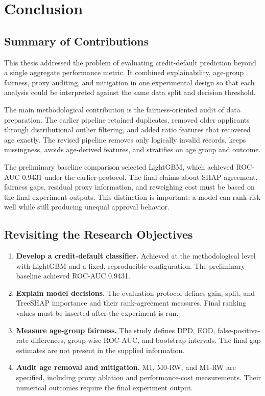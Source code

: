 \chapter{Conclusion}
\label{chap:conclusion}

\section{Summary of Contributions}

This thesis addressed the problem of evaluating credit-default prediction
beyond a single aggregate performance metric. It combined explainability,
age-group fairness, proxy auditing, and mitigation in one experimental design
so that each analysis could be interpreted against the same data split and
decision threshold.

The main methodological contribution is the fairness-oriented audit of data
preparation. The earlier pipeline retained duplicates, removed older
applicants through distributional outlier filtering, and added ratio features
that recovered age exactly. The revised pipeline removes only logically
invalid records, keeps missingness, avoids age-derived features, and stratifies
on age group and outcome.

The preliminary baseline comparison selected LightGBM, which achieved ROC-AUC
0.9431 under the earlier protocol. The final claims about SHAP agreement,
fairness gaps, residual proxy information, and reweighing cost must be based
on the final experiment outputs. This distinction is important: a model can
rank risk well while still producing unequal approval behavior.

\section{Revisiting the Research Objectives}

\begin{enumerate}
  \item \textbf{Develop a credit-default classifier.} Achieved at the
  methodological level with LightGBM and a fixed, reproducible configuration.
  The preliminary baseline achieved ROC-AUC 0.9431.
  \item \textbf{Explain model decisions.} The evaluation protocol defines
  gain, split, and TreeSHAP importance and their rank-agreement measures.
  Final ranking values must be inserted after the experiment is run.
  \item \textbf{Measure age-group fairness.} The study defines DPD, EOD,
  false-positive-rate differences, group-wise ROC-AUC, and bootstrap intervals.
  The final gap estimates are not present in the supplied information.
  \item \textbf{Audit age removal and mitigation.} M1, M0-RW, and M1-RW are
  specified, including proxy ablation and performance-cost measurements.
  Their numerical outcomes require the final experiment output.
\end{enumerate}

